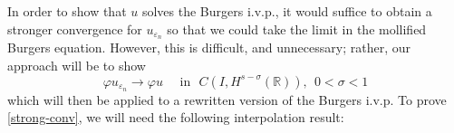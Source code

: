 \documentclass[12pt,reqno]{amsart}
\newcommand{\rr}{\mathbb{R}}
\newcommand{\zz}{\mathbb{Z}}
\newcommand{\ee}{\varepsilon}
\theoremstyle{plain}  %
\theoremstyle{definition}
\begin{document}
%
%
%
%
%
%
		In order to show that $u$ solves the Burgers i.v.p., it would
		suffice to obtain a stronger convergence for  $u_{\ee_n}$ so that 
		we could take the limit in the mollified Burgers equation. However,
		this is difficult, and unnecessary; rather, our approach will be
		to show
		\begin{equation}
			\label{strong-conv}
			\varphi u_{\ee_n}\longrightarrow \varphi u
			\quad
			\text{ in } \,\,   C(I, H^{s-\sigma}(\rr)), \ \ 0< \sigma < 1
		\end{equation}
		which will then be applied to a rewritten version of the Burgers
		i.v.p. To prove \eqref{strong-conv}, we will need the following
		interpolation result:


\end{document}
